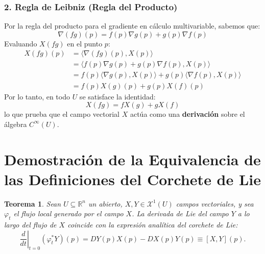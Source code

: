 \documentclass[11pt,a4paper]{article}
\theoremstyle{definition}
\theoremstyle{plain}
\newtheorem{teorema}{Teorema}[section]
\theoremstyle{remark}
\begin{document}
	\subsubsection*{2. Regla de Leibniz (Regla del Producto)}
	Por la regla del producto para el gradiente en cálculo multivariable, sabemos que:
	\[
	\nabla(fg)(p) = f(p) \nabla g(p) + g(p) \nabla f(p)
	\]
	Evaluando $X(fg)$ en el punto $p$:
	\[
	\begin{aligned}
		X(fg)(p) &= \langle \nabla(fg)(p), X(p) \rangle \\
		&= \langle f(p) \nabla g(p) + g(p) \nabla f(p), X(p) \rangle \\
		&= f(p) \langle \nabla g(p), X(p) \rangle + g(p) \langle \nabla f(p), X(p) \rangle \\
		&= f(p) X(g)(p) + g(p) X(f)(p)
	\end{aligned}
	\]
	Por lo tanto, en todo $U$ se satisface la identidad:
	\[
	X(fg) = f X(g) + g X(f)
	\]
	lo que prueba que el campo vectorial $X$ actúa como una \textbf{derivación} sobre el álgebra $C^\infty(U)$.
	
	\section*{Demostración de la Equivalencia de las Definiciones del Corchete de Lie}
	
	\begin{teorema}
		Sean $U \subseteq \mathbb{R}^n$ un abierto, $X, Y \in \mathcal{X}^1(U)$ campos vectoriales, y sea $\varphi_t$ el flujo local generado por el campo $X$. La derivada de Lie del campo $Y$ a lo largo del flujo de $X$ coincide con la expresión analítica del corchete de Lie:
		\[
		\left. \frac{d}{dt} \right|_{t=0} (\varphi_t^* Y)(p) = DY(p) X(p) - DX(p) Y(p) \equiv [X, Y](p).
		\]
	\end{teorema}
	
\end{document}
